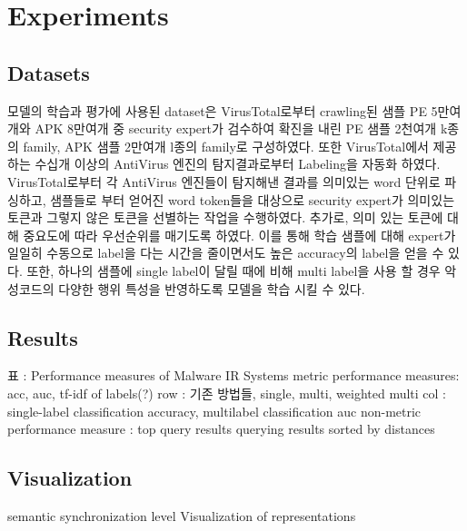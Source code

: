 \section{Experiments}
\subsection{Datasets}
모델의 학습과 평가에 사용된 dataset은 VirusTotal로부터 crawling된 샘플 PE 5만여개와 APK 8만여개 중 security expert가 검수하여 확진을 내린 PE 샘플 2천여개 k종의 family, APK 샘플 2만여개 l종의 family로 구성하였다.
또한 VirusTotal에서 제공하는 수십개 이상의 AntiVirus 엔진의 탐지결과로부터 Labeling을 자동화 하였다. VirusTotal로부터 각 AntiVirus 엔진들이 탐지해낸 결과를 의미있는 word 단위로 파싱하고, 샘플들로 부터 얻어진 word token들을 대상으로 security expert가 의미있는 토큰과 그렇지 않은 토큰을 선별하는 작업을 수행하였다. 추가로, 의미 있는 토큰에 대해 중요도에 따라 우선순위를 매기도록 하였다. 이를 통해 학습 샘플에 대해 expert가 일일히 수동으로 label을 다는 시간을 줄이면서도 높은 accuracy의 label을 얻을 수 있다. 또한, 하나의 샘플에 single label이 달릴 때에 비해 multi label을 사용 할 경우 악성코드의 다양한 행위 특성을 반영하도록 모델을 학습 시킬 수 있다. 


\subsection{Results}

표 : Performance measures of Malware IR Systems
metric performance measures: acc, auc, tf-idf of labels(?)
row : 기존 방법들, single, multi, weighted multi
col : single-label classification accuracy, multilabel classification auc
non-metric performance measure : top query results
querying results sorted by distances

\subsection{Visualization}
semantic synchronization level
Visualization of representations




